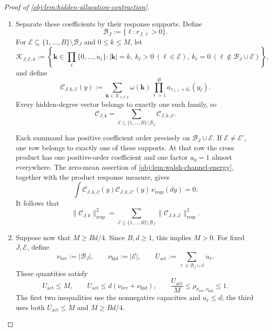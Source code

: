 \begin{proof}[Proof of \cref{obj:lem:hidden-allocation-contraction}]
\begin{enumerate}
For a square-integrable function
\(\varpi:\mathbb R^B\to\mathbb R\), write
\[
\|\varpi\|_{\mathrm{resp}}^2
:=
\int_{\mathbb R^B}\varpi(y)^2\,\nu_{\mathrm{resp}}(dy).
\]
The zero-degree coefficient is
\[
\mathcal C_{\varnothing,0}(y)=\prod_{\ell=1}^B a_0(y_\ell)=1
\quad\text{for }\nu_{\mathrm{resp}}\text{-almost every }y.
\]
Subtracting this coefficient, applying sign orthogonality, and integrating over \(y\) proves the exact labeled-energy identity
\[
\chi_H^2
=
\sum_{\substack{
J\subseteq\bigcup_\ell R_\ell,\ 0\le k\le M\\
(J,k)\ne(\varnothing,0)}}
\frac{\|\mathcal C_{J,k}\|_{\mathrm{resp}}^2}{\binom Mk}.
\]

\item Separate these coefficients by their response supports. Define
\[
\mathcal B_J:=\{\ell:r_{J,\ell}>0\}.
\]
For \(\mathcal E\subseteq\{1,\ldots,B\}\setminus\mathcal B_J\) and
\(0\le k\le M\), let
\[
\mathscr K_{J,\mathcal E,k}
:=
\left\{
\boldsymbol k\in\prod_\ell\{0,\ldots,u_\ell\}:
|\boldsymbol k|=k,\
k_\ell>0\ (\ell\in\mathcal E),\
k_\ell=0\ (\ell\notin\mathcal B_J\cup\mathcal E)
\right\},
\]
and define
\[
\mathcal C_{J,k,\mathcal E}(y)
:=
\sum_{\boldsymbol k\in\mathscr K_{J,\mathcal E,k}}
\omega(\boldsymbol k)
\prod_{\ell=1}^B a_{r_{J,\ell}+k_\ell}(y_\ell).
\]
Every hidden-degree vector belongs to exactly one such family, so
\[
\mathcal C_{J,k}
=
\sum_{\mathcal E\subseteq\{1,\ldots,B\}\setminus\mathcal B_J}
\mathcal C_{J,k,\mathcal E}.
\]

Each summand has positive coefficient order precisely on
\(\mathcal B_J\cup\mathcal E\). If \(\mathcal E\ne\mathcal E'\), one row belongs to exactly one of these supports. At that row the cross product has one positive-order coefficient and one factor \(a_0=1\) almost everywhere. The zero-mean assertion of
\cref{obj:lem:walsh-channel-energy}, together with the product response measure, gives
\[
\int
\mathcal C_{J,k,\mathcal E}(y)
\mathcal C_{J,k,\mathcal E'}(y)\,
\nu_{\mathrm{resp}}(dy)=0.
\]
It follows that
\[
\|\mathcal C_{J,k}\|_{\mathrm{resp}}^2
=
\sum_{\mathcal E\subseteq\{1,\ldots,B\}\setminus\mathcal B_J}
\|\mathcal C_{J,k,\mathcal E}\|_{\mathrm{resp}}^2.
\]

\item Suppose now that \(M\ge Bd/4\). Since \(B,d\ge1\), this implies \(M>0\).
For fixed \(J,\mathcal E\), define
\[
\nu_{\mathrm{rev}}:=|\mathcal B_J|,
\qquad
\nu_{\mathrm{hid}}:=|\mathcal E|,
\qquad
U_{\mathrm{act}}:=\sum_{\ell\in\mathcal B_J\cup\mathcal E}u_\ell.
\]
These quantities satisfy
\[
U_{\mathrm{act}}\le M,
\qquad
U_{\mathrm{act}}\le d(\nu_{\mathrm{rev}}+\nu_{\mathrm{hid}}),
\qquad
\frac{U_{\mathrm{act}}}{M}
\le\rho_{\nu_{\mathrm{rev}},\nu_{\mathrm{hid}}}\le1.
\]
The first two inequalities use the nonnegative capacities and \(u_\ell\le d\); the third uses both \(U_{\mathrm{act}}\le M\) and \(M\ge Bd/4\).


\end{enumerate}
\end{proof}
